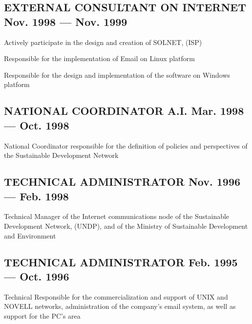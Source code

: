 \documentclass[letter,10pt]{article}
\begin{document}
\subsection{{EXTERNAL CONSULTANT ON INTERNET \hfill Nov. 1998 --- Nov. 1999}}
\begin{zitemize}
\item	Actively participate in the design and creation of SOLNET, (ISP)
\item	Responsible for the implementation of Email on Linux platform
\item	Responsible for the design and implementation of the software on Windows platform	
\end{zitemize}
\vspace*{2mm}
\subsection{{NATIONAL COORDINATOR A.I. \hfill Mar. 1998 --- Oct. 1998}}
\begin{zitemize}
\item National Coordinator responsible for the definition of policies and perspectives of the Sustainable Development Network	
\end{zitemize}
\vspace*{2mm}
\subsection{{TECHNICAL ADMINISTRATOR \hfill Nov. 1996 --- Feb. 1998}}
\begin{zitemize}
\item Technical Manager of the Internet communications node of the Sustainable Development Network, (UNDP), and of the Ministry of Sustainable Development and Environment	
\end{zitemize}
\vspace*{2mm}
\subsection{{TECHNICAL ADMINISTRATOR \hfill Feb. 1995 --- Oct. 1996}}
\begin{zitemize}
	\item	Technical Responsible for the commercialization and support of UNIX and NOVELL networks, administration of the company's email system, as well as support for the PC's area	
\end{zitemize}
\end{document}
